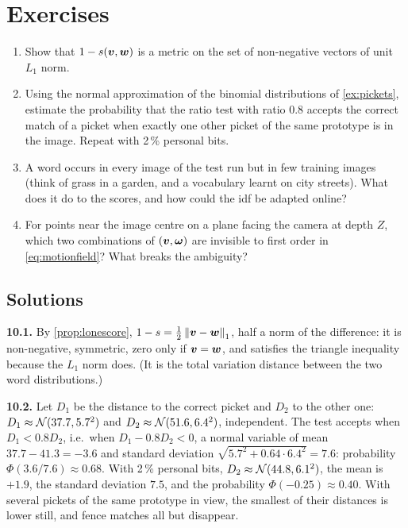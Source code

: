 \FloatBarrier
\section*{Exercises}

\begin{enumerate}[label=\textbf{10.\arabic*},ref=10.\arabic*]
\item\label{ex:10metric} Show that $1-s(\bm{v},\bm{w})$ is a metric
  on the set of non-negative vectors of unit $L_1$ norm.
\item\label{ex:10ratio} Using the normal approximation of the binomial
  distributions of \cref{ex:pickets}, estimate the probability that the
  ratio test with ratio $0.8$ accepts the correct match of a picket
  when exactly one other picket of the same prototype is in the image.
  Repeat with 2\,\% personal bits.
\item\label{ex:10idf} A word occurs in every image of the test run but
  in few training images (think of grass in a garden, and a vocabulary
  learnt on city streets). What does it do to the scores, and how could
  the idf be adapted online?
\item\label{ex:10motion} For points near the image centre on a plane
  facing the camera at depth $Z$, which two combinations of $(\bm{v},
  \bm{\omega})$ are invisible to first order in \eqref{eq:motionfield}?
  What breaks the ambiguity?
\end{enumerate}

\subsection*{Solutions}

\textbf{10.1.} By \cref{prop:lonescore}, $1-s=\frac12\left\lVert \bm{v}-
\bm{w}\right\rVert_1$, half a norm of the difference: it is non-negative,
symmetric, zero only if $\bm{v}=\bm{w}$, and satisfies the triangle
inequality because the $L_1$ norm does. (It is the total variation
distance between the two word distributions.)

\textbf{10.2.} Let $D_1$ be the distance to the correct picket and
$D_2$ to the other one: $D_1\approx\mathcal{N}(37.7,5.7^2)$ and
$D_2\approx\mathcal{N}(51.6,6.4^2)$, independent. The test accepts when
$D_1<0.8D_2$, i.e.\ when $D_1-0.8D_2<0$, a normal variable of mean
$37.7-41.3=-3.6$ and standard deviation $\sqrt{5.7^2+0.64\cdot6.4^2}=
7.6$: probability $\Phi(3.6/7.6)\approx0.68$. With 2\,\% personal bits,
$D_2\approx\mathcal{N}(44.8,6.1^2)$, the mean is $+1.9$, the standard
deviation $7.5$, and the probability $\Phi(-0.25)\approx0.40$. With
several pickets of the same prototype in view, the smallest of their
distances is lower still, and fence matches all but disappear.

